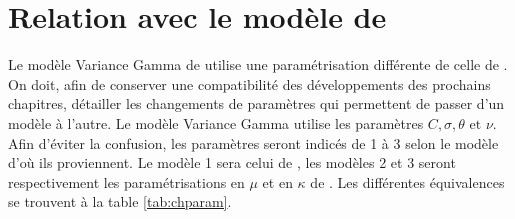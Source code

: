 \section{Relation avec le modèle de \cite{madan1990variance}}
\label{sec:relation-avec-le}

Le modèle Variance Gamma de \cite{madan1990variance} utilise une
paramétrisation différente de celle de \cite{kotz2001laplace}. On
doit, afin de conserver une compatibilité des développements des
prochains chapitres, détailler les changements de paramètres qui
permettent de passer d'un modèle à l'autre. Le modèle Variance Gamma
utilise les paramètres $C,\sigma,\theta \mbox{ et } \nu$. Afin
d'éviter la confusion, les paramètres seront indicés de 1 à 3 selon le
modèle d'où ils proviennent. Le modèle 1 sera celui de
\cite{madan1990variance}, les modèles 2 et 3 seront respectivement les
paramétrisations en $\mu$ et en $\kappa$ de
\cite{kotz2001laplace}. Les différentes équivalences se trouvent à la
table \ref{tab:chparam}.
